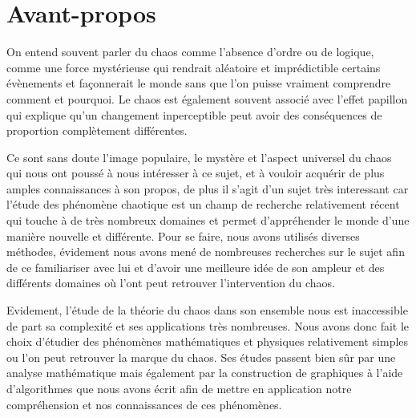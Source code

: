 \chapter*{Avant-propos}
On entend souvent parler du chaos comme l'absence d'ordre ou de logique, comme une force mystérieuse qui 
rendrait aléatoire et imprédictible certains évènements et façonnerait le monde sans que l'on puisse vraiment 
comprendre comment et pourquoi. Le chaos est également souvent associé avec l'effet papillon 
qui explique qu'un changement inperceptible peut avoir des conséquences de proportion complètement différentes.

Ce sont sans doute l'image populaire, le mystère et l'aspect universel du chaos qui nous ont poussé à nous intéresser
 à ce sujet, et à vouloir acquérir de plus amples connaissances à son propos, de plus il s'agit d'un sujet très interessant
  car l'étude des phénomène chaotique est un champ de recherche relativement récent qui touche à de très nombreux domaines et 
  permet d'appréhender le monde d'une manière nouvelle et différente.  Pour se faire, nous avons utilisés diverses méthodes, 
  évidement nous avons mené de nombreuses recherches sur le sujet afin de ce familiariser avec lui et d'avoir une meilleure idée
   de son ampleur et des différents domaines où l'ont peut retrouver l'intervention du chaos. 

Evidement, l'étude de la théorie du chaos dans son ensemble nous est inaccessible de part sa complexité et ses applications très nombreuses.
 Nous avons donc fait le choix d'étudier des phénomènes mathématiques et physiques relativement simples ou l'on peut retrouver la marque du chaos. 
 Ses études passent bien sûr par une analyse mathématique mais également par la construction de graphiques à l'aide d'algorithmes que nous avons écrit
  afin de mettre en application notre compréhension et nos connaissances de ces phénomènes.

